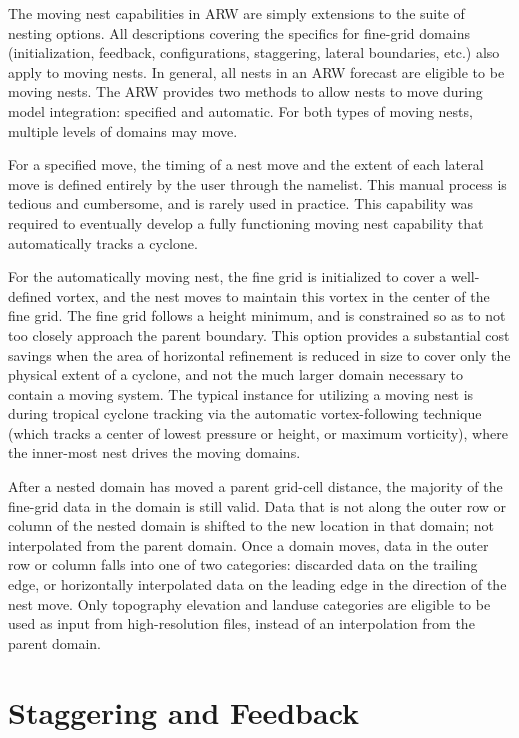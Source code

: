 The moving nest capabilities in ARW are simply extensions to the 
suite of nesting options.  All descriptions covering the 
specifics for fine-grid
domains (initialization, feedback, configurations, staggering,
lateral boundaries, etc.) also apply to moving nests.  In
general, all nests
in an ARW forecast are eligible to be moving nests.  The ARW
provides two methods to allow nests to move during model
integration: specified and automatic.
For both types of moving nests,
multiple levels of domains may move.  

For a specified move, the timing of a nest move and the extent
of each lateral move is defined entirely by the user through
the namelist. This manual process is tedious and cumbersome, and is 
rarely used in practice. This capability was required to eventually
develop a fully functioning moving nest capability that automatically 
tracks a cyclone.  

For the
automatically moving nest, the fine grid is initialized to cover
a well-defined vortex, and the nest moves to maintain this vortex
in the center of the fine grid. The fine grid follows a height 
minimum, and is constrained so as to not too closely approach 
the parent boundary. This option provides a substantial cost savings
when the area of horizontal refinement is reduced in 
size to cover only the physical extent of a cyclone, and not the 
much larger domain necessary to contain a moving system.
The typical instance for utilizing a moving nest is during tropical
cyclone tracking via the automatic vortex-following technique (which 
tracks a center of lowest pressure or height, or maximum vorticity), 
where the inner-most nest drives the moving domains.

After a nested domain has moved a parent grid-cell distance,
the majority of the fine-grid data in the domain is still valid.  Data 
that is not along the outer row or column of the nested
domain is shifted to the new location in that domain; not interpolated
from the parent domain.
Once a domain moves, data in the outer
row or column falls into one of two categories: discarded data on the
trailing edge, or horizontally interpolated data on the
leading edge in the direction of the nest move. 
Only topography elevation and landuse categories are eligible
to be used as input from high-resolution files, instead of an interpolation
from the parent domain.

\section{Staggering and Feedback}

